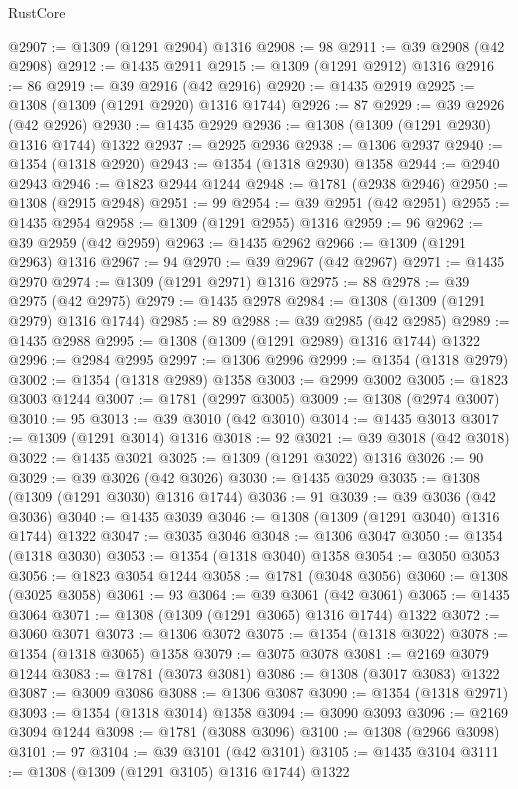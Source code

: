 \begin{lexlean}{RustCore}
\begin{coremodule}
@2907 := @1309 (@1291 @2904) @1316
@2908 := 98
@2911 := @39 @2908 (@42 @2908)
@2912 := @1435 @2911
@2915 := @1309 (@1291 @2912) @1316
@2916 := 86
@2919 := @39 @2916 (@42 @2916)
@2920 := @1435 @2919
@2925 := @1308 (@1309 (@1291 @2920) @1316 @1744)
@2926 := 87
@2929 := @39 @2926 (@42 @2926)
@2930 := @1435 @2929
@2936 := @1308 (@1309 (@1291 @2930) @1316 @1744) @1322
@2937 := @2925 @2936
@2938 := @1306 @2937
@2940 := @1354 (@1318 @2920)
@2943 := @1354 (@1318 @2930) @1358
@2944 := @2940 @2943
@2946 := @1823 @2944 @1244
@2948 := @1781 (@2938 @2946)
@2950 := @1308 (@2915 @2948)
@2951 := 99
@2954 := @39 @2951 (@42 @2951)
@2955 := @1435 @2954
@2958 := @1309 (@1291 @2955) @1316
@2959 := 96
@2962 := @39 @2959 (@42 @2959)
@2963 := @1435 @2962
@2966 := @1309 (@1291 @2963) @1316
@2967 := 94
@2970 := @39 @2967 (@42 @2967)
@2971 := @1435 @2970
@2974 := @1309 (@1291 @2971) @1316
@2975 := 88
@2978 := @39 @2975 (@42 @2975)
@2979 := @1435 @2978
@2984 := @1308 (@1309 (@1291 @2979) @1316 @1744)
@2985 := 89
@2988 := @39 @2985 (@42 @2985)
@2989 := @1435 @2988
@2995 := @1308 (@1309 (@1291 @2989) @1316 @1744) @1322
@2996 := @2984 @2995
@2997 := @1306 @2996
@2999 := @1354 (@1318 @2979)
@3002 := @1354 (@1318 @2989) @1358
@3003 := @2999 @3002
@3005 := @1823 @3003 @1244
@3007 := @1781 (@2997 @3005)
@3009 := @1308 (@2974 @3007)
@3010 := 95
@3013 := @39 @3010 (@42 @3010)
@3014 := @1435 @3013
@3017 := @1309 (@1291 @3014) @1316
@3018 := 92
@3021 := @39 @3018 (@42 @3018)
@3022 := @1435 @3021
@3025 := @1309 (@1291 @3022) @1316
@3026 := 90
@3029 := @39 @3026 (@42 @3026)
@3030 := @1435 @3029
@3035 := @1308 (@1309 (@1291 @3030) @1316 @1744)
@3036 := 91
@3039 := @39 @3036 (@42 @3036)
@3040 := @1435 @3039
@3046 := @1308 (@1309 (@1291 @3040) @1316 @1744) @1322
@3047 := @3035 @3046
@3048 := @1306 @3047
@3050 := @1354 (@1318 @3030)
@3053 := @1354 (@1318 @3040) @1358
@3054 := @3050 @3053
@3056 := @1823 @3054 @1244
@3058 := @1781 (@3048 @3056)
@3060 := @1308 (@3025 @3058)
@3061 := 93
@3064 := @39 @3061 (@42 @3061)
@3065 := @1435 @3064
@3071 := @1308 (@1309 (@1291 @3065) @1316 @1744) @1322
@3072 := @3060 @3071
@3073 := @1306 @3072
@3075 := @1354 (@1318 @3022)
@3078 := @1354 (@1318 @3065) @1358
@3079 := @3075 @3078
@3081 := @2169 @3079 @1244
@3083 := @1781 (@3073 @3081)
@3086 := @1308 (@3017 @3083) @1322
@3087 := @3009 @3086
@3088 := @1306 @3087
@3090 := @1354 (@1318 @2971)
@3093 := @1354 (@1318 @3014) @1358
@3094 := @3090 @3093
@3096 := @2169 @3094 @1244
@3098 := @1781 (@3088 @3096)
@3100 := @1308 (@2966 @3098)
@3101 := 97
@3104 := @39 @3101 (@42 @3101)
@3105 := @1435 @3104
@3111 := @1308 (@1309 (@1291 @3105) @1316 @1744) @1322

\end{coremodule}
\end{lexlean}
